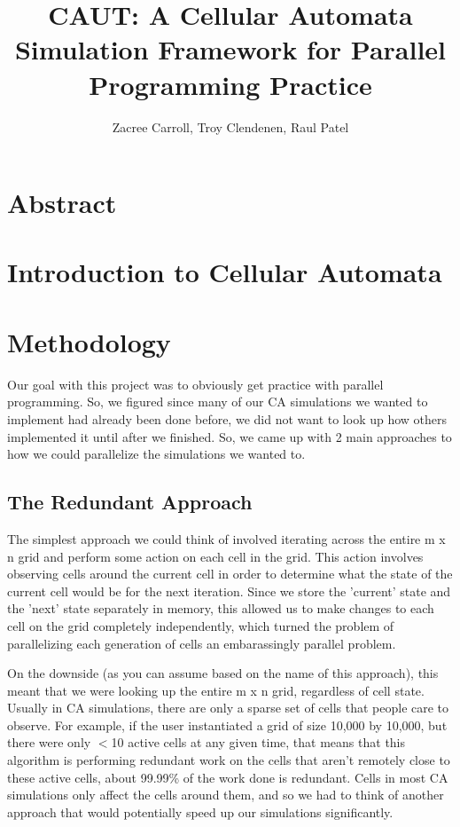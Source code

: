 \documentclass[12pt]{article}
\begin{document}
\title{CAUT: A Cellular Automata Simulation Framework for Parallel Programming Practice}
\author{Zacree Carroll, Troy Clendenen, Raul Patel}

\maketitle

\section{Abstract}

\section{Introduction to Cellular Automata}

\section{Methodology}
Our goal with this project was to obviously get practice with parallel programming. So, we figured since many of our CA simulations we wanted to implement had already been done before, we did not want to look up how others implemented it until after we finished. So, we came up with 2 main approaches to how we could parallelize the simulations we wanted to.

\subsection{The Redundant Approach}
The simplest approach we could think of involved iterating across the entire m x n grid and perform some action on each cell in the grid. This action involves observing cells around the current cell in order to determine what the state of the current cell would be for the next iteration. Since we store the 'current' state and the 'next' state separately in memory, this allowed us to make changes to each cell on the grid completely independently, which turned the problem of parallelizing each generation of cells an embarassingly parallel problem.

On the downside (as you can assume based on the name of this approach), this meant that we were looking up the entire m x n grid, regardless of cell state. Usually in CA simulations, there are only a sparse set of cells that people care to observe. For example, if the user instantiated a grid of size 10,000 by 10,000, but there were only $<$10 active cells at any given time, that means that this algorithm is performing redundant work on the cells that aren't remotely close to these active cells, about 99.99\% of the work done is redundant. Cells in most CA simulations only affect the cells around them, and so we had to think of another approach that would potentially speed up our simulations significantly.
\end{document}
